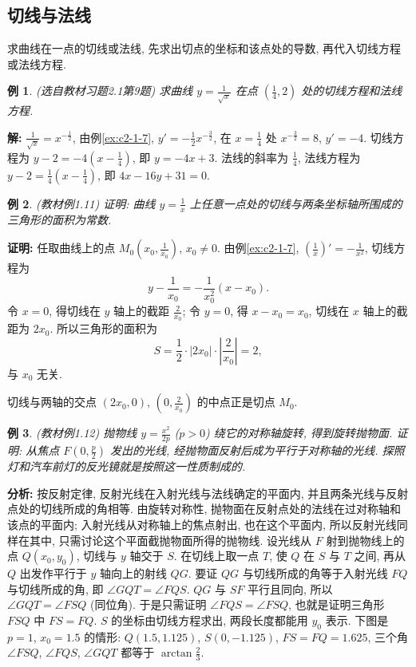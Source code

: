 \documentclass[UTF8,openany]{ctexbook}
\theoremstyle{chinesetextbook}
\newtheorem{example}{例}[section]
\newenvironment{cnproof}{\par\indent\textbf{证明:} \ignorespaces}{\par}
\newenvironment{cnsolution}{\par\indent\textbf{解:} \ignorespaces}{\par}
\begin{document}
\subsection{切线与法线}
求曲线在一点的切线或法线, 先求出切点的坐标和该点处的导数, 再代入切线方程或法线方程.
\begin{example}\label{ex:c2-h1-9}
\textnormal{(选自教材习题2.1第9题)} 求曲线 $\displaystyle y=\frac1{\sqrt x}$ 在点 $\displaystyle\left(\frac14,2\right)$ 处的切线方程和法线方程.
\end{example}
\begin{cnsolution}
$\displaystyle\frac1{\sqrt x}=x^{-\frac12}$, 由例\ref{ex:c2-1-7}, $\displaystyle y'=-\frac12x^{-\frac32}$, 在 $\displaystyle x=\frac14$ 处 $x^{-\frac32}=8$, $y'=-4$. 切线方程为 $\displaystyle y-2=-4\left(x-\frac14\right)$, 即 $y=-4x+3$. 法线的斜率为 $\displaystyle\frac14$, 法线方程为 $\displaystyle y-2=\frac14\left(x-\frac14\right)$, 即 $4x-16y+31=0$.
\end{cnsolution}
\begin{example}\label{ex:c2-1-11}
\textnormal{(教材例1.11)} 证明: 曲线 $\displaystyle y=\frac1x$ 上任意一点处的切线与两条坐标轴所围成的三角形的面积为常数.
\end{example}
\begin{cnproof}
任取曲线上的点 $\displaystyle M_0\left(x_0,\frac1{x_0}\right)$, $x_0\ne0$. 由例\ref{ex:c2-1-7}, $\displaystyle\left(\frac1x\right)'=-\frac1{x^2}$, 切线方程为
\[
y-\frac1{x_0}=-\frac1{x_0^2}(x-x_0).
\]
令 $x=0$, 得切线在 $y$ 轴上的截距 $\displaystyle\frac2{x_0}$; 令 $y=0$, 得 $x-x_0=x_0$, 切线在 $x$ 轴上的截距为 $2x_0$. 所以三角形的面积为
\[
S=\frac12\cdot|2x_0|\cdot\left|\frac2{x_0}\right|=2,
\]
与 $x_0$ 无关.
\end{cnproof}
切线与两轴的交点 $(2x_0,0)$, $\displaystyle\left(0,\frac2{x_0}\right)$ 的中点正是切点 $M_0$.
\begin{example}\label{ex:c2-1-12}
\textnormal{(教材例1.12)} 抛物线 $\displaystyle y=\frac{x^2}{2p}$ ($p>0$) 绕它的对称轴旋转, 得到旋转抛物面. 证明: 从焦点 $\displaystyle F\left(0,\frac p2\right)$ 发出的光线, 经抛物面反射后成为平行于对称轴的光线. 探照灯和汽车前灯的反光镜就是按照这一性质制成的.
\end{example}
\par\indent\textbf{分析:} 按反射定律, 反射光线在入射光线与法线确定的平面内, 并且两条光线与反射点处的切线所成的角相等. 由旋转对称性, 抛物面在反射点处的法线在过对称轴和该点的平面内; 入射光线从对称轴上的焦点射出, 也在这个平面内, 所以反射光线同样在其中, 只需讨论这个平面截抛物面所得的抛物线. 设光线从 $F$ 射到抛物线上的点 $Q(x_0,y_0)$, 切线与 $y$ 轴交于 $S$. 在切线上取一点 $T$, 使 $Q$ 在 $S$ 与 $T$ 之间, 再从 $Q$ 出发作平行于 $y$ 轴向上的射线 $QG$. 要证 $QG$ 与切线所成的角等于入射光线 $FQ$ 与切线所成的角, 即 $\angle GQT=\angle FQS$. $QG$ 与 $SF$ 平行且同向, 所以 $\angle GQT=\angle FSQ$ (同位角). 于是只需证明 $\angle FQS=\angle FSQ$, 也就是证明三角形 $FSQ$ 中 $FS=FQ$. $S$ 的坐标由切线方程求出, 两段长度都能用 $y_0$ 表示. 下图是 $p=1$, $x_0=1.5$ 的情形: $Q(1.5,1.125)$, $S(0,-1.125)$, $FS=FQ=1.625$, 三个角 $\angle FSQ$, $\angle FQS$, $\angle GQT$ 都等于 $\displaystyle\arctan\frac23$.
\end{document}
